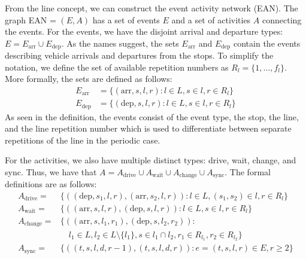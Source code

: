 \documentclass[english, 12pt, a4paper, sci, utf8, a-2b, online]{aaltothesis}
\newcommand{\Earr}{E_\text{arr}}
\newcommand{\Edep}{E_\text{dep}}
\newcommand{\Async}{A_\text{sync}}
\begin{document}
From the line concept, we can construct the event activity network (EAN). The graph EAN = $(E, A)$ has a set of events $E$ and a set of activities $A$ connecting the events. For the events, we have the disjoint arrival and departure types: $E = \Earr \cup \Edep$. As the names suggest, the sets $\Earr$ and $\Edep$ contain the events describing vehicle arrivals and departures from the stops. To simplify the notation, we define the set of available repetition numbers as $R_l = \{1, \dots, f_l\}$. More formally, the sets are defined as follows:
\begin{align*}
    \Earr &= \{
        (\text{arr}, s, l, r) : l \in L, s \in l, r \in R_l
    \} \\
    \Edep &= \{
        (\text{dep}, s, l, r) : l \in L, s \in l, r \in R_l
    \}
\end{align*}
As seen in the definition, the events consist of the event type, the stop, the line, and the line repetition number which is used to differentiate between separate repetitions of the line in the periodic case.

For the activities, we also have multiple distinct types: drive, wait, change, and sync. Thus, we have that $A = A_\text{drive} \cup A_\text{wait} \cup A_\text{change} \cup \Async$. The formal definitions are as follows:
\begin{align*}
    A_\text{drive} =& \{(
        (\text{dep}, s_1, l, r),
        (\text{arr}, s_2, l, r)
    ): l \in L, (s_1, s_2) \in l, r \in R_l\}\\
    A_\text{wait} =& \{(
        (\text{arr}, s, l, r),
        (\text{dep}, s, l, r)
    ): l \in L, s \in l, r \in R_l\} \\
    A_\text{change} =& \{(
        (\text{arr}, s, l_1, r_1),
        (\text{dep}, s, l_2, r_2)
    ): \\&\quad l_1 \in L, l_2 \in L\setminus \{l_1\}, s \in l_1 \cap l_2, r_1 \in R_{l_1}, r_2 \in R_{l_2}\} \\
    A_\text{sync} =& \{(
       (t, s, l, d, r-1),
       (t, s, l, d, r)
    ): e=(t, s, l, r) \in E, r \geq 2 \}
\end{align*}
\end{document}
